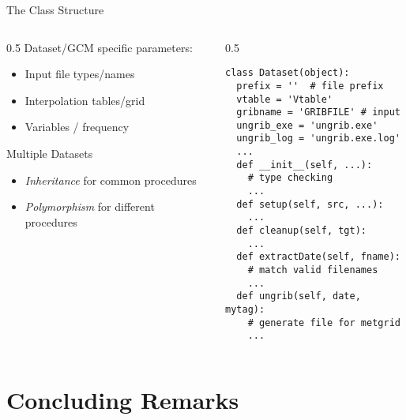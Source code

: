 \documentclass[hyperref={pdfpagelabels=false},compress,final]{beamer}
\newenvironment{myBox}[3][shadow=true]%
{\begin{center} \begin{minipage}{#2} \begin{beamerboxesrounded}[#1]{#3} \smallskip}%
{\smallskip \end{beamerboxesrounded} \end{minipage} \end{center}}
\begin{document}
\begin{frame}[fragile=singleslide]{The Class Structure}
  \begin{columns}
    \begin{column}{0.5\textwidth}
      Dataset/GCM specific parameters: \smallskip
      \begin{itemize}
        \item Input file types/names\smallskip
        \item Interpolation tables/grid \smallskip
        \item Variables / frequency \smallskip
      \end{itemize}
        \begin{myBox}{0.9\textwidth}{Multiple Datasets}
          \begin{itemize}
            \item \textit{\color{purple} Inheritance} for common procedures \smallskip
            \item \textit{\color{teal} Polymorphism} for different procedures
          \end{itemize}
        \end{myBox}
    \end{column}
    \begin{column}{0.5\textwidth}
      \vspace*{-1.25cm}
      \begin{myBox}{1.0\textwidth}{}
        \footnotesize
        \begin{verbatim}
class Dataset(object):
  prefix = ''  # file prefix
  vtable = 'Vtable'
  gribname = 'GRIBFILE' # input
  ungrib_exe = 'ungrib.exe'
  ungrib_log = 'ungrib.exe.log'
  ...
  def __init__(self, ...):
    # type checking
    ...
  def setup(self, src, ...):
    ...
  def cleanup(self, tgt):
    ...
  def extractDate(self, fname):
    # match valid filenames
    ...
  def ungrib(self, date, mytag):
    # generate file for metgrid
    ...
        \end{verbatim}
      \end{myBox}
    \end{column}
  \end{columns}
\end{frame}

\section[Conclusion]{Concluding Remarks}
\end{document}
